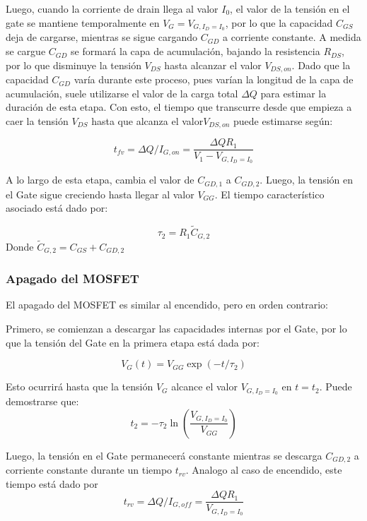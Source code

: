 \documentclass[e4_tp1_main.tex]{subfiles}
\begin{document}
Luego, cuando la corriente de drain llega al valor $I_0$, el valor de la tensión en el gate se mantiene temporalmente en $V_G=V_{G,I_D=I_0}$, por lo que la capacidad $C_{GS}$ deja de cargarse, mientras se sigue cargando $C_{GD}$ a corriente constante. A medida se cargue $C_{GD}$ se formará la capa de acumulación, bajando la resistencia $R_{DS}$, por lo que disminuye la tensión $V_{DS}$ hasta alcanzar el valor $V_{DS,on}$. Dado que la capacidad $C_{GD}$ varía durante este proceso, pues varían la longitud de la capa de acumulación, suele utilizarse el valor de la carga total $\Delta Q$ para estimar la duración de esta etapa. Con esto, el tiempo que transcurre desde que empieza a caer la tensión $V_{DS}$ hasta que alcanza el valor$V_{DS,on}$ puede estimarse según:

\begin{equation}
t_{fv} = \Delta Q/I_{G,on} = \frac{\Delta Q R_1}{V_{1}-V_{G,I_D=I_0}}
\end{equation}

A lo largo de esta etapa, cambia el valor de $C_{GD,1}$ a $C_{GD,2}$. Luego, la tensión en el Gate sigue creciendo hasta llegar al valor $V_{GG}$. El tiempo característico asociado está dado por:

\begin{equation}
\tau_2 = R_1\tilde{C}_{G,2}
\end{equation}
Donde $\tilde{C}_{G,2} = C_{GS} + C_{GD,2}$

\subsubsection{Apagado del MOSFET}

El apagado del MOSFET es similar al encendido, pero en orden contrario:

Primero, se comienzan a descargar las capacidades internas por el Gate, por lo que la tensión del Gate en la primera etapa está dada por:

\begin{equation}
V_G(t) = V_{GG} \exp(-t/\tau_2)
\end{equation}

Esto ocurrirá hasta que la tensión $V_G$ alcance el valor $V_{G,I_D=I_0}$ en $t=t_2$. Puede demostrarse que:
\begin{equation}
t_2= -\tau_2\ln\left(\frac{V_{G,I_D=I_0}}{V_{GG}}\right)
\end{equation}

Luego, la tensión en el Gate permanecerá constante mientras se descarga $C_{GD,2}$ a corriente constante durante un tiempo $t_{rv}$. Analogo al caso de encendido, este tiempo está dado por
\begin{equation}
t_{rv} = \Delta Q/I_{G,off} = \frac{\Delta Q R_1}{V_{G,I_D=I_0}}
\end{equation}
\end{document}
